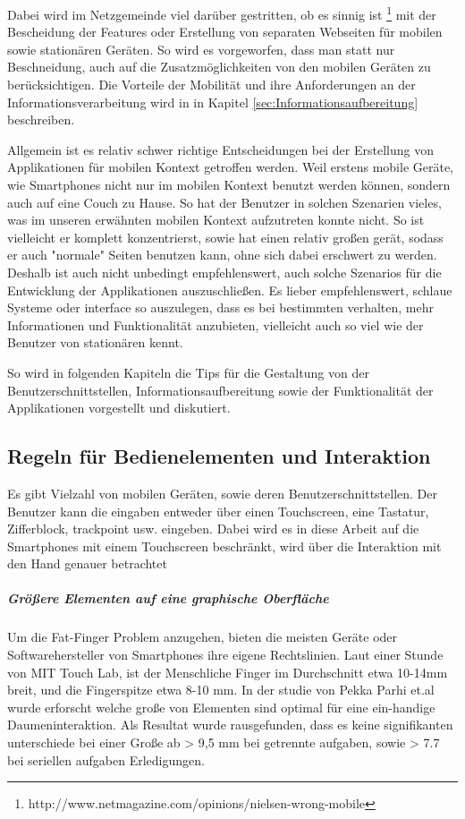 Dabei wird im Netzgemeinde viel darüber gestritten, ob es sinnig ist \footnote{http://www.netmagazine.com/opinions/nielsen-wrong-mobile} mit der Bescheidung der Features oder Erstellung von separaten Webseiten für mobilen sowie stationären Geräten. So wird es vorgeworfen, dass man statt nur Beschneidung, auch auf die Zusatzmöglichkeiten von den mobilen Geräten zu berücksichtigen. Die Vorteile der Mobilität und ihre Anforderungen an der Informationsverarbeitung wird in in Kapitel \ref{sec:Informationsaufbereitung} beschreiben.

Allgemein ist es relativ schwer richtige Entscheidungen bei der Erstellung von Applikationen für mobilen Kontext getroffen werden. Weil erstens mobile Geräte, wie Smartphones nicht nur im mobilen Kontext benutzt werden können, sondern auch auf eine Couch zu Hause. So hat der Benutzer in solchen Szenarien vieles, was im unseren erwähnten mobilen Kontext aufzutreten konnte nicht. So ist vielleicht er komplett konzentrierst, sowie hat einen relativ großen gerät, sodass er auch "normale" Seiten benutzen kann, ohne sich dabei erschwert zu werden. Deshalb ist auch nicht unbedingt empfehlenswert, auch solche Szenarios für die Entwicklung der Applikationen auszuschließen. Es lieber empfehlenswert, schlaue Systeme oder interface so auszulegen, dass es bei bestimmten verhalten, mehr Informationen und Funktionalität anzubieten, vielleicht auch so viel wie der Benutzer von stationären kennt.

So wird in folgenden Kapiteln die Tips für die Gestaltung von der Benutzerschnittstellen, Informationsaufbereitung sowie der Funktionalität der Applikationen vorgestellt und diskutiert.


\subsection{Regeln für Bedienelementen und Interaktion}
\label{sub:Benutzerschnittstellen}

Es gibt Vielzahl von mobilen Geräten, sowie deren Benutzerschnittstellen. Der Benutzer kann die eingaben entweder über einen Touchscreen, eine Tastatur, Zifferblock, trackpoint usw. eingeben. Dabei wird es in diese Arbeit auf die Smartphones mit einem Touchscreen beschränkt, wird über die Interaktion mit den Hand genauer betrachtet

\subparagraph{Größere Elementen auf eine graphische Oberfläche } 
\label{subp:gro_ere_interface_elementen}

Um die Fat-Finger Problem anzugehen, bieten die meisten Geräte oder Softwarehersteller von Smartphones ihre eigene Rechtslinien. Laut einer Stunde von MIT Touch Lab, ist der Menschliche Finger im Durchschnitt­ etwa 10-14mm breit, und die Fingerspitze etwa 8-10 mm\cite{Srinivasan:2003uu}. In der studie von Pekka Parhi et.al\cite{Parhi:2006gh} wurde erforscht welche große von Elementen sind optimal für eine ein-handige Daumeninteraktion. Als Resultat wurde rausgefunden, dass es keine signifikanten unterschiede bei einer Große ab > 9,5 mm bei getrennte aufgaben, sowie > 7.7 bei seriellen aufgaben Erledigungen.  

